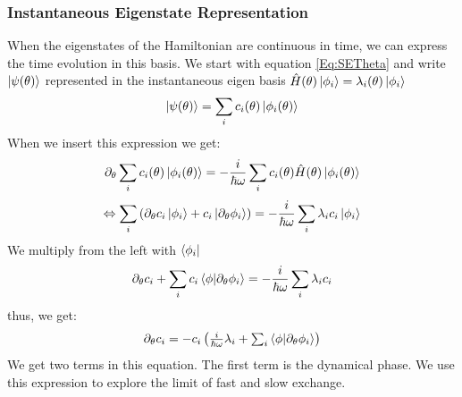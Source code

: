 \documentclass[Master]{subfiles}
\begin{document}
\subsubsection{Instantaneous Eigenstate Representation}
When the eigenstates of the Hamiltonian are continuous in time, we can express the time evolution in this basis.
We start with equation \eqref{Eq:SETheta} and write $\ket{\psi(\theta)}$ represented in the instantaneous eigen basis $\hat{H}(\theta) \ket{\phi_i} = \lambda_i(\theta) \ket{\phi_i} $
$$\ket{\psi(\theta)} = \sum_{i} c_i(\theta) \ket{\phi_i(\theta)}$$
When we insert this expression we get:
$$\partial_{\theta} \sum_{i} c_i(\theta) \ket{\phi_i(\theta)} = - \frac{i}{\hbar \omega} \sum_{i} c_i(\theta) \hat{H}(\theta)  \ket{\phi_i(\theta)}$$
$$ \Leftrightarrow  \sum_{i} \left(  \partial_{\theta} c_i \ket{\phi_i}+c_i \ket{\partial_{\theta} \phi_i}\right) = - \frac{i}{\hbar \omega} \sum_{i} \lambda_i c_i\ket{\phi_i}$$
We multiply from the left with $\bra{\phi_i}$
$$   \partial_{\theta}c_i + \sum_{i}  c_i \braket{\phi}{\partial_{\theta}\phi_i} = - \frac{i}{\hbar \omega} \sum_{i} \lambda_i c_i $$
thus, we get:
\begin{dmath}\label{Eq:SEThetaInst}
$$   \partial_{\theta} c_i  =  - c_i  \left( \frac{i}{\hbar \omega} \lambda_i + \sum_{i} \braket{\phi}{\partial_{\theta}\phi_i} \right)$$
\end{dmath}
We get two terms in this equation. The first term is the dynamical phase. We use this expression to explore the limit of fast and slow exchange.
\end{document}
